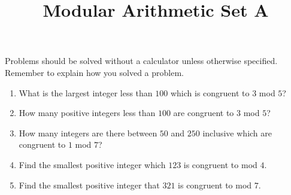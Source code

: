 \documentclass{article}
\title{Modular Arithmetic Set A}
\author{}
\date{}
\begin{document}
\maketitle
\noindent Problems should be solved without a calculator unless otherwise specified.
Remember to explain how you solved a problem.
\begin{multicols}{2}
    \begin{enumerate}
        \item What is the largest integer less than $100$ which is congruent to $3$ mod $5$?
        \vspace{3cm}
        \item How many positive integers less than $100$ are congruent to $3$ mod $5$?
        \vspace{3cm}
        \item How many integers are there between $50$ and $250$ inclusive which are congruent to $1$ mod $7$?
        \vspace{3cm}
        \columnbreak
        \item Find the smallest positive integer which $123$ is congruent to mod $4$.
        \vspace{3cm}
        \item Find the smallest positive integer that $321$ is congruent to mod $7$.
        \vspace{3cm}
    \end{enumerate}
\end{multicols}
\end{document}
